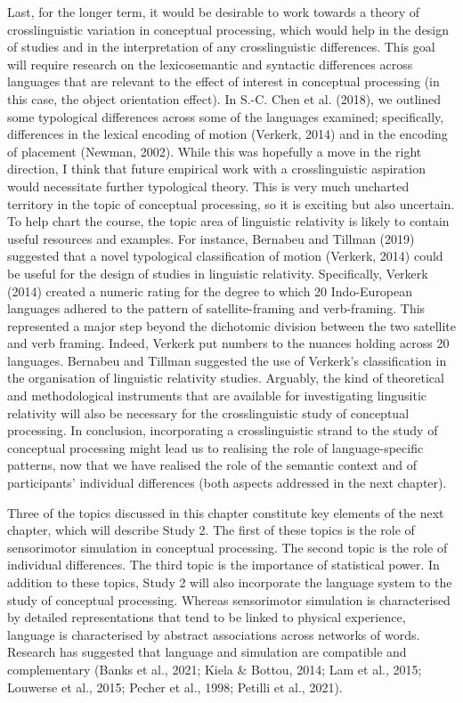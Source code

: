 \documentclass[
  12pt,
  man,floatsintext]{apa7}
\begin{document}
Last, for the longer term, it would be desirable to work towards a theory of crosslinguistic variation in conceptual processing, which would help in the design of studies and in the interpretation of any crosslinguistic differences. This goal will require research on the lexicosemantic and syntactic differences across languages that are relevant to the effect of interest in conceptual processing (in this case, the object orientation effect). In S.-C. Chen et al. (2018), we outlined some typological differences across some of the languages examined; specifically, differences in the lexical encoding of motion (Verkerk, 2014) and in the encoding of placement (Newman, 2002). While this was hopefully a move in the right direction, I think that future empirical work with a crosslinguistic aspiration would necessitate further typological theory. This is very much uncharted territory in the topic of conceptual processing, so it is exciting but also uncertain. To help chart the course, the topic area of linguistic relativity is likely to contain useful resources and examples. For instance, Bernabeu and Tillman (2019) suggested that a novel typological classification of motion (Verkerk, 2014) could be useful for the design of studies in linguistic relativity. Specifically, Verkerk (2014) created a numeric rating for the degree to which 20 Indo-European languages adhered to the pattern of satellite-framing and verb-framing. This represented a major step beyond the dichotomic division between the two satellite and verb framing. Indeed, Verkerk put numbers to the nuances holding across 20 languages. Bernabeu and Tillman suggested the use of Verkerk's classification in the organisation of linguistic relativity studies. Arguably, the kind of theoretical and methodological instruments that are available for investigating lingusitic relativity will also be necessary for the crosslinguistic study of conceptual processing. In conclusion, incorporating a crosslinguistic strand to the study of conceptual processing might lead us to realising the role of language-specific patterns, now that we have realised the role of the semantic context and of participants' individual differences (both aspects addressed in the next chapter).

Three of the topics discussed in this chapter constitute key elements of the next chapter, which will describe Study 2. The first of these topics is the role of sensorimotor simulation in conceptual processing. The second topic is the role of individual differences. The third topic is the importance of statistical power. In addition to these topics, Study 2 will also incorporate the language system to the study of conceptual processing. Whereas sensorimotor simulation is characterised by detailed representations that tend to be linked to physical experience, language is characterised by abstract associations across networks of words. Research has suggested that language and simulation are compatible and complementary (Banks et al., 2021; Kiela \& Bottou, 2014; Lam et al., 2015; Louwerse et al., 2015; Pecher et al., 1998; Petilli et al., 2021).
\end{document}
